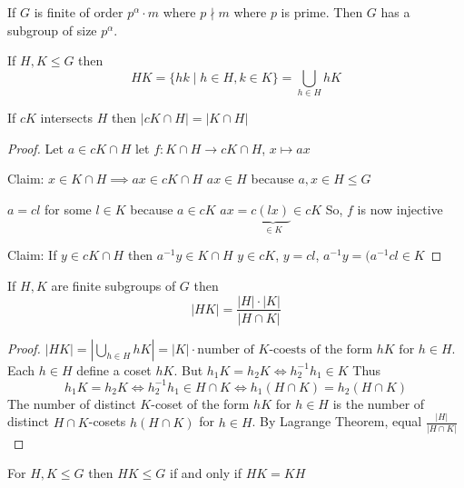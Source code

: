 \begin{theorem}[Sylow]
  If $G$ is finite of order $p^\alpha \cdot m$ where $p \nmid m$ where $p$ is prime.
  Then $G$ has a subgroup of size $p^\alpha$.
\end{theorem}

\begin{definition}
  If $H, K \le G$ then $$HK = \{hk \mid h \in H, k \in K\} = \bigcup_{h \in H} hK$$
\end{definition}

\begin{lemma}
  If $cK$ intersects $H$ then $|cK \cap H| = |K \cap H|$
\end{lemma}

\begin{proof}
  Let $a \in cK \cap H$ let $f : K \cap H \to cK \cap H$, $x \mapsto ax$

  Claim: $x\in K \cap H \implies ax \in cK \cap H$
  $ax \in H$ because $a, x \in H \le G$

  $a = cl$ for some $l \in K$ because $a \in cK$
  $ax = c\underbrace{(lx)}_{\in K} \in cK$
  So, $f$ is now injective

  Claim: If $y \in cK \cap H$ then $a^{-1}y \in K \cap H$
  $y \in cK$, $y = cl$, $a^{-1}y = (a^{-1}cl \in K$

\end{proof}

\begin{theorem}
  If $H, K$ are finite subgroups of $G$ then 
  \[|HK| = \frac{|H|\cdot|K|}{|H \cap K|}\]
\end{theorem}

\begin{proof}
  $|HK| = |\displaystyle\bigcup_{h \in H} hK| = |K| \cdot \text{number of $K$-coests of the form $hK$ for $h \in H$}$.
  Each $h \in H$ define a coset $hK$. But $h_1K = h_2K \iff h_2^{-1}h_1 \in K$ Thus
  \[h_1K = h_2K \iff h_2^{-1}h_1 \in H \cap K \iff h_1(H \cap K)= h_2(H \cap K)\]
  The number of distinct $K$-coset of the form $hK$ for $h \in H$ is the number of distinct $H\cap K$-cosets $h(H \cap K)$ for $h \in H$.
  By Lagrange Theorem, equal $\frac{|H|}{|H \cap K|}$
\end{proof}

\begin{proposition}
  For $H, K \le G$ then $HK \le G$ if and only if $HK = KH$
\end{proposition}

